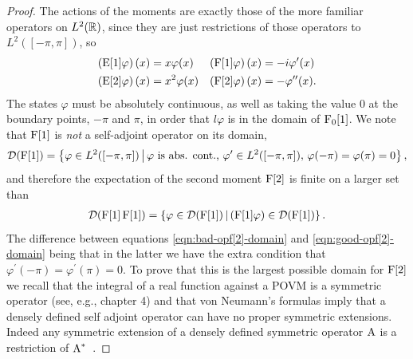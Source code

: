 \begin{proof}
The actions of the moments are exactly those of the more familiar operators on $L^2(\mathbb{R})$, since they are just restrictions of those operators to $L^2([-\pi,\pi])$, so
\begin{align}
  \left(\operatorname{E}[1]\varphi\right)(x) &= x\varphi(x) & \left(\operatorname{F}[1]\varphi\right)(x) &= -i\varphi^\prime(x)\\
  \left(\operatorname{E}[2]\varphi\right)(x) &= x^2\varphi(x) & \left(\operatorname{F}[2]\varphi\right)(x) &= -\varphi^{\prime\prime}(x). 
\end{align}
The states $\varphi$ must be absolutely continuous, as well as taking the value $0$ at the boundary points, $-\pi$ and $\pi$, in order that $l\varphi$ is in the domain of $\operatorname{F}_0[1]$. We note that $\operatorname{F}[1]$ is \emph{not} a self-adjoint operator on its domain,
\begin{align}
  \mathcal{D}(\operatorname{F}[1]) = \left\{\varphi\in L^2([-\pi,\pi])\, \middle|\, \varphi \text{ is abs. cont., } \varphi^\prime\in L^2([-\pi,\pi]),\, \varphi(-\pi) = \varphi(\pi) = 0\right\},
\end{align}
and therefore the expectation of the second moment $\operatorname{F}[2]$ is finite on a larger set than 
\begin{align}\label{eqn:bad-opf[2]-domain}
  \mathcal{D}(\operatorname{F}[1]\operatorname{F}[1]) = \left\{\varphi\in\mathcal{D}(\operatorname{F}[1])\,\middle|\,\left(\operatorname{F}[1]\varphi\right)\in\mathcal{D}(\operatorname{F}[1])\right\}.
\end{align}
The difference between equations \eqref{eqn:bad-opf[2]-domain} and \eqref{eqn:good-opf[2]-domain} being that in the latter we have the extra condition that $\varphi^\prime(-\pi) = \varphi^\prime(\pi) = 0$. To prove that this is the largest possible domain for $\operatorname{F}[2]$ we recall that the integral of a real function against a POVM is a symmetric operator (see, e.g., \cite{quantum-measurement-busch-et-al} chapter 4) and that von Neumann's formulas imply that a densely defined self adjoint operator can have no proper symmetric extensions. Indeed any symmetric extension of a densely defined symmetric operator $\operatorname{A}$ is a restriction of $\operatorname{A}^*$~\cite{akhiezer-glazman-lin-ops-hilb-space}.


\end{proof}
